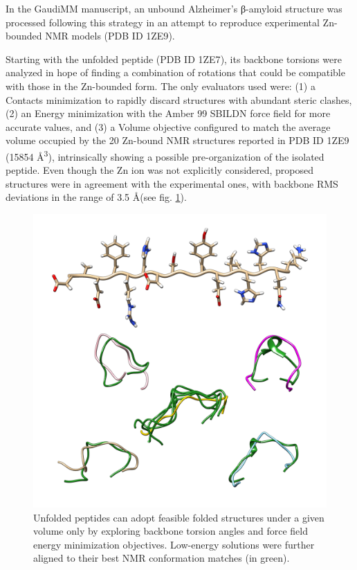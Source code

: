 In the GaudiMM manuscript, an unbound Alzheimer's β-amyloid structure was processed following this strategy in an attempt to reproduce experimental Zn-bounded NMR models (PDB ID 1ZE9\cite{pdb:1ze9}).

Starting with the unfolded peptide (PDB ID 1ZE7\cite{pdb:1ze7}), its backbone torsions were analyzed in hope of finding a combination of rotations that could be compatible with those in the Zn-bounded form. The only evaluators used were: (1) a Contacts minimization to rapidly discard structures with abundant steric clashes, (2) an Energy minimization with the Amber 99 SBILDN force field for more accurate values, and (3) a Volume objective configured to match the average volume occupied by the 20 Zn-bound NMR structures reported in PDB ID 1ZE9 (15854 Å\textsuperscript{3}), intrinsically showing a possible pre-organization of the isolated peptide. Even though the Zn ion was not explicitly considered, proposed structures were in agreement with the experimental ones, with backbone RMS deviations in the range of 3.5 \AA (see fig. \ref{fig:peptide-folding}).


\begin{figure}
	\begin{Center}
		\includegraphics[width=\textwidth]{./figures/06/peptide-folding.png}
	\end{Center}
	\caption[Peptide folding]{Unfolded peptides can adopt feasible folded structures under a given volume only by exploring backbone torsion angles and force field energy minimization objectives. Low-energy solutions were further aligned to their best NMR conformation matches (in green).}
	\label{fig:peptide-folding}
\end{figure}


